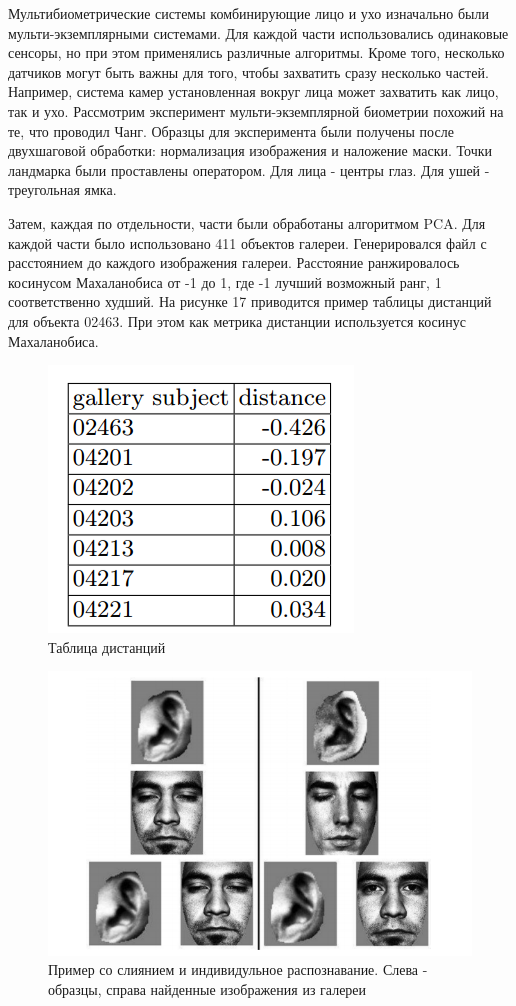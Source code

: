 \documentclass[12pt,a4paper]{article}					%
\begin{document}
Мультибиометрические системы комбинирующие лицо и ухо изначально были мульти-экземплярными системами.
Для каждой части использовались одинаковые сенсоры, но при этом применялись различные алгоритмы.
Кроме того, несколько датчиков могут быть важны для того, чтобы захватить сразу несколько частей.
Например, система камер установленная вокруг лица может захватить как лицо, так и ухо.
Рассмотрим эксперимент мульти-экземплярной биометрии похожий на те, что проводил Чанг.
Образцы для эксперимента были получены после двухшаговой обработки: нормализация изображения и наложение маски.
Точки ландмарка были проставлены оператором.
Для лица - центры глаз.
Для ушей - треугольная ямка.

Затем, каждая по отдельности, части были обработаны алгоритмом PCA.
Для каждой части было использовано 411 объектов галереи.
Генерировался файл с расстоянием до каждого изображения галереи.
Расстояние ранжировалось косинусом Махаланобиса от -1 до 1, где -1 лучший возможный ранг, 1 соответственно худший.
На рисунке 17 приводится пример таблицы дистанций для объекта 02463.
При этом как метрика дистанции используется косинус Махаланобиса.

\begin{figure}[h!]
\centering
\includegraphics[scale=0.60]{res/distances_table}
\caption{Таблица дистанций}
\end{figure}

\begin{figure}[h!]
\centering
\includegraphics[scale=1.0]{res/ex_individual_failed}
\caption{Пример со слиянием и индивидульное распознавание. Слева - образцы, справа найденные изображения из галереи }
\end{figure}
\end{document}
